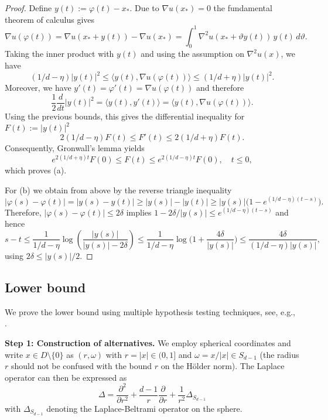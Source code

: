 \documentclass{article}
\numberwithin{equation}{section}
\theoremstyle{definition}
\renewcommand{\phi}{\varphi}
\renewcommand{\theta}{\vartheta}
\providecommand{\abs}[1]{\lvert #1 \rvert}
\providecommand{\scapro}[2]{\langle #1,#2 \rangle}
\renewcommand{\le}{\leqslant}
\renewcommand{\ge}{\geqslant}
\begin{document}
\begin{proof}
Define $y(t):=\phi(t)-x_\ast$. Due to $\nabla u(x_\ast)=0$ the
fundamental theorem of calculus gives
\[
    \nabla u(\phi(t))
    =
    \nabla u(x_\ast+y(t))-\nabla u(x_\ast)
    =
    \int_0^1
    \nabla^2u(x_\ast+\theta y(t))\,y(t)\,d\theta.
\]
Taking the inner product with $y(t)$ and using the assumption on $\nabla^2u (x)$, we have
\[
    (1/d-\eta)|y(t)|^2
    \le
    \scapro{y(t)}{\nabla u(\phi(t))}
    \le
    (1/d+\eta)|y(t)|^2 .
\]
Moreover, we have $y'(t)=\phi'(t)=\nabla u(\phi(t))$ and therefore
\[
    \frac12\frac{d}{dt}|y(t)|^2
    = \scapro{y(t)}{y'(t)}=
    \scapro{y(t)}{\nabla u(\phi(t))}.
\]
Using the previous bounds, this gives the differential inequality for $F(t):=|y(t)|^2$ 
\[
2(1/d-\eta)F(t)
    \le
    F'(t)
    \le
    2(1/d+\eta)F(t).
\]
Consequently, Gronwall's lemma  yields
\[
    e^{2(1/d+\eta)t}F(0)
    \le
    F(t)
    \le
    e^{2(1/d-\eta)t}F(0),\quad t\le 0,
\]
which proves (a).

For (b) we obtain from above by the reverse triangle inequality
\[
    |\varphi(s)-\varphi(t)|
    =
    |y(s)-y(t)|
    \ge
    |y(s)|-|y(t)|\ge 
    \abs{y(s)}\big(1-e^{(1/d-\eta)(t-s)}\big).
\]
Therefore, $|\varphi(s)-\varphi(t)|\le 2\delta$
implies
$1- 2\delta/\abs{y(s)}\le e^{(1/d-\eta)(t-s)}$
and hence
\[
    s-t
    \le
    \frac1{1/d-\eta}\log\left(\frac{\abs{y(s)}}{\abs{y(s)}-2\delta}\right)\le \frac1{1/d-\eta} \log\Big(1 +\frac {4\delta}{\abs{y(s)}}\Big)\le \frac{4 \delta}{(1/d-\eta)\abs{y(s)}},
\]
using $2\delta\le \abs{y(s)}/2$.
\end{proof}



\subsection{Lower bound}

We prove the lower bound using multiple hypothesis testing techniques, see, e.g., \cite{tsybakov2003introduction}.

\textbf{Step 1: Construction of alternatives.} We employ spherical coordinates and write  $x\in D\setminus\{0\}$ as $(r,\omega)$ with $r=\abs{x}\in (0,1]$ and $\omega=x/\abs{x}\in S_{d-1}$ (the radius $r$ should not be confused with the bound $r$ on the H\"older norm). The Laplace operator can then be expressed as
\[ \Delta=\frac{\partial^2}{\partial r^2}+\frac{d-1}{r}\frac{\partial}{\partial r}+\frac{1}{r^2}\Delta_{S_{d-1}}
\]
with $\Delta_{S_{d-1}}$ denoting the Laplace-Beltrami operator  on the sphere.
\end{document}
